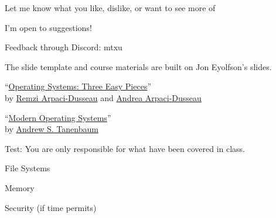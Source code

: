 \begin{slide}


    Let me know what you like, dislike, or want to see more of
    \bigskip
    
    I'm open to suggestions!
	\bigskip
	
	Feedback through Discord: mtxu

\end{slide}

\begin{slide}

	
	The slide template and course materials are built on Jon Eyolfson's slides.
	
\end{slide}

\begin{slide}


    ``\href{https://pages.cs.wisc.edu/~remzi/OSTEP/}
	   {Operating Systems: Three Easy Pieces}'' \\
    by \href{http://www.cs.wisc.edu/~remzi/}{Remzi Arpaci-Dusseau}
    and \href{http://www.cs.wisc.edu/~dusseau/}{Andrea Arpaci-Dusseau}
    \bigskip

    ``\href{https://en.wikipedia.org/wiki/Modern_Operating_Systems}
           {Modern Operating Systems}'' \\
    by \href{https://en.wikipedia.org/wiki/Andrew_S._Tanenbaum}{Andrew S. Tanenbaum}
    \bigskip
							      
    Test: You are only responsible for what have been covered in class.

\end{slide}

\begin{slide}

	
	File Systems
	\bigskip
	
	Memory
	\bigskip
	
	Security (if time permits)

\end{slide}

